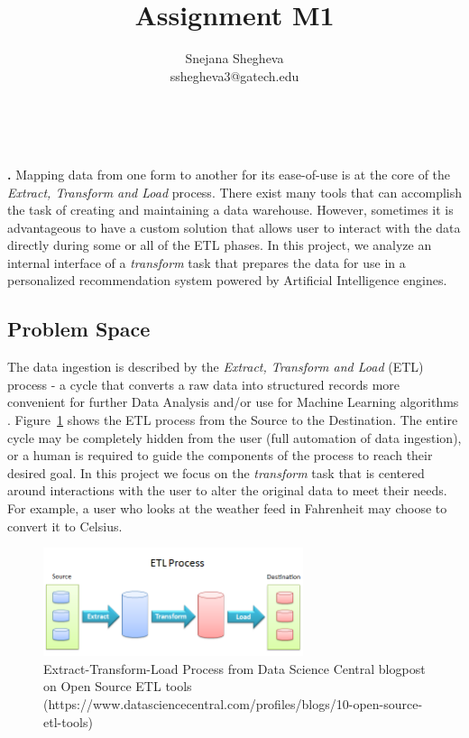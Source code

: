 \documentclass[12pt,letterpaper]{article}
\makeatletter
\renewcommand{\maketitle}{\bgroup
   \begin{center}
   \textbf{{\fontsize{18pt}{20}\selectfont \@title}}\\
   \vspace{10pt}
   {\fontsize{12pt}{0}\selectfont \@author} 
   \end{center}
}
\newenvironment{myquote}[1]%
  {\list{}{\leftmargin=#1\rightmargin=#1}\item[]}%
  {\endlist}
\renewenvironment{abstract}
{\vspace*{-.5in}\fontsize{12pt}{12}\begin{myquote}{.5in}
\noindent \par{\bfseries \abstractname.}}
{\medskip\noindent
\end{myquote}
}
\makeatother
\begin{document}
\title{Assignment M1}
\author{Snejana Shegheva \\ sshegheva3@gatech.edu}

\maketitle
\thispagestyle{fancy}

\begin{abstract}
Mapping data from one form to another for its ease-of-use is at the core of the \textit{Extract, Transform and Load} process. There exist many tools that can accomplish the task of creating and maintaining a data warehouse. However, sometimes it is advantageous to have a custom solution that allows user to interact with the data directly during some or all of the ETL phases. In this project, we analyze an internal interface of a \textit{transform} task that prepares the data for use in a personalized recommendation system powered by Artificial Intelligence engines. 
\end{abstract}

\subsection*{Problem Space}
The data ingestion is described by the \textit{Extract, Transform and Load} (ETL) process - a cycle that converts a raw data into structured records more convenient for further Data Analysis and/or use for Machine Learning algorithms \cite{wiki:xxx}. Figure~\ref{fig::1} shows the ETL process from the Source to the Destination. The entire cycle may be completely hidden from the user (full automation of data ingestion), or a human is required to guide the components of the process to reach their desired goal. In this project we focus on the \textit{transform} task that is centered around interactions with the user to alter the original data to meet their needs. For example, a user who looks at the weather feed in Fahrenheit may choose to convert it to Celsius. 

\begin{figure}[H]
\centering
\includegraphics[width=3in, scale=.3]{ETLProcess.png}
\caption{Extract-Transform-Load Process from Data Science Central blogpost on Open Source ETL tools (https://www.datasciencecentral.com/profiles/blogs/10-open-source-etl-tools)}
\label{fig::1}
\end{figure}
\end{document}
